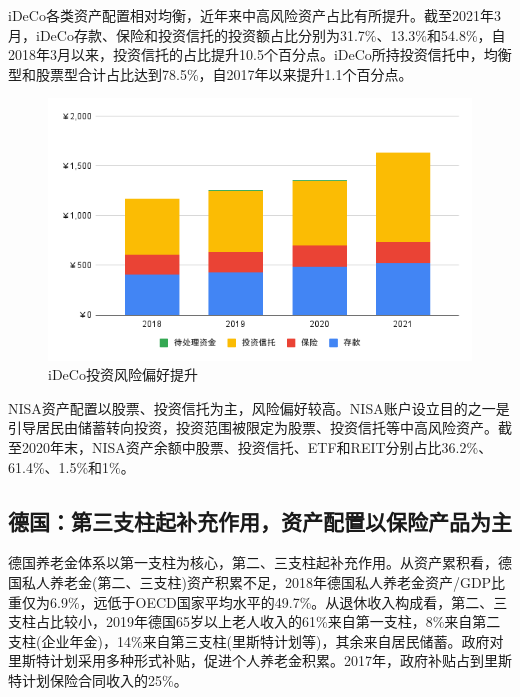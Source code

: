 \documentclass[a4paper,zihao=5]{ctexart}
\begin{document}
iDeCo各类资产配置相对均衡，近年来中高风险资产占比有所提升。截至2021年3月，iDeCo存款、保险和投资信托的投资额占比分别为31.7\%、13.3\%和54.8\%，自2018年3月以来，投资信托的占比提升10.5个百分点。iDeCo所持投资信托中，均衡型和股票型合计占比达到78.5\%，自2017年以来提升1.1个百分点。
\begin{figure}[H]
    \centering
    \includegraphics[width=\linewidth]{img/iDeCo投资风险偏好提升.png}
    \caption{iDeCo投资风险偏好提升}
\end{figure}

NISA资产配置以股票、投资信托为主，风险偏好较高。NISA账户设立目的之一是引导居民由储蓄转向投资，投资范围被限定为股票、投资信托等中高风险资产。截至2020年末，NISA资产余额中股票、投资信托、ETF和REIT分别占比36.2\%、61.4\%、1.5\%和1\%。

\subsection{德国：第三支柱起补充作用，资产配置以保险产品为主}
德国养老金体系以第一支柱为核心，第二、三支柱起补充作用。从资产累积看，德国私人养老金(第二、三支柱)资产积累不足，2018年德国私人养老金资产/GDP比重仅为6.9\%，远低于OECD国家平均水平的49.7\%。从退休收入构成看，第二、三支柱占比较小，2019年德国65岁以上老人收入的61\%来自第一支柱，8\%来自第二支柱(企业年金)，14\%来自第三支柱(里斯特计划等)，其余来自居民储蓄。政府对里斯特计划采用多种形式补贴，促进个人养老金积累。2017年，政府补贴占到里斯特计划保险合同收入的25\%。
\end{document}
